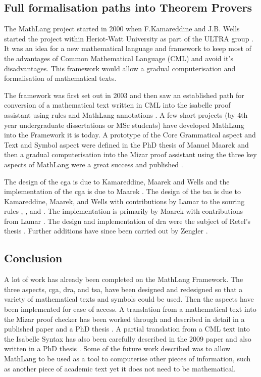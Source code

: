 \subsection{Full formalisation paths into Theorem Provers}

The MathLang project started in 2000 when F.Kamareddine and J.B. Wells started the project within Heriot-Watt University as part of the ULTRA group \cite{researchprop}. It was an idea for a new mathematical language and framework to keep most of the advantages of Common Mathematical Language (CML) and avoid it's disadvantages. This framework would allow a gradual computerisation and formalisation of mathematical texts.

The framework was first set out in 2003 \cite{firstyear} and then saw an established path for conversion of a mathematical text written in CML into the isabelle proof assistant using rules and MathLang annotations \cite{secondyear}. A few short projects (by 4th year undergraduate dissertations or MSc students) have developed MathLang into the Framework it is today. A prototype of the Core Grammatical aspect and Text and Symbol aspect were defined in the PhD thesis of Manuel Maarek \cite{manuelphd} and then a gradual computerisation into the Mizar proof assistant using the three key aspects of MathLang were a great success and published \cite{mathintomizar}.

The design of the \gls{cga} is due to Kamareddine, Maarek and Wells \cite{oomathlang} and the implementation of the \gls{cga} is due to Maarek \cite{manuelphd}. The design of the \gls{tsa} is due to Kamareddine, Maarek, and Wells with contributions by Lamar to the souring rules \cite{restoringtsa}, \cite{manuelphd}, and \cite{lamarphd}. The implementation is primarily by Maarek \cite{manuelphd} with contributions from Lamar \cite{lamarphd}. The design and implementation of \gls{dra} were the subject of Retel's thesis \cite{krzysztofphd}. Further additions have since been carried out by Zengler \cite{cmtim}.

\subsection{Conclusion}
A lot of work has already been completed on the MathLang Framework. The three aspects, \gls{cga}, \gls{dra}, and \gls{tsa}, have been designed and redesigned so that a variety of mathematical texts and symbols could be used. Then the aspects have been implemented for ease of access. A translation from a mathematical text into the Mizar proof checker has been worked through and described in detail in a published paper \cite{mathintomizar} and a PhD thesis \cite{manuelphd}. A partial translation from a CML text into the Isabelle Syntax has also been carefully described in the 2009 paper \cite{mathintoisa} and also written in a PhD thesis \cite{lamarphd}. Some of the future work described was to allow MathLang to be used as a tool to computerise other pieces of information, such as another piece of academic text yet it does not need to be mathematical.

